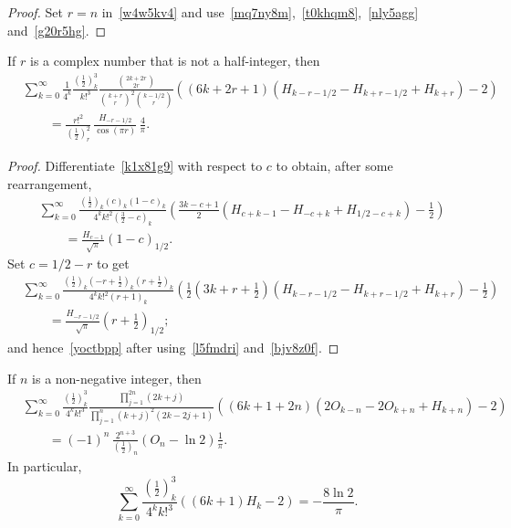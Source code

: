 \documentclass[12pt,reqno]{article}
\begin{document}
\begin{proof}
Set $r=n$ in~\eqref{w4w5kv4} and use~\eqref{mq7ny8m},~\eqref{t0khqm8},~\eqref{nly5agg} and~\eqref{g20r5hg}.
\end{proof}
\begin{theorem}
If $r$ is a complex number that is not a half-integer, then
\begin{align}\label{yoctbpp}
&\sum_{k = 0}^\infty  {\frac{1}{{4^k }}\frac{{\left( {\frac{1}{2}} \right)_k^3 }}{{k!^3 }}\frac{{\binom{{2k + 2r}}{{2r}}}}{{\binom{{k + r}}{r}^2 \binom{{k - 1/2}}{r}}}\left( {\left( {6k + 2r + 1} \right)\left( {H_{k - r - 1/2}  - H_{k + r - 1/2}  + H_{k + r} } \right) - 2} \right)}\nonumber\\ 
&\qquad = \frac{{r!^2 }}{{\left( {\frac{1}{2}} \right)_r^2 }}\,\frac{{H_{ - r - 1/2} }}{{\cos \left( {\pi r} \right)}}\,\frac{4}{\pi }.
\end{align}
\end{theorem}
\begin{proof}
Differentiate~\eqref{k1x81g9} with respect to $c$ to obtain, after some rearrangement,
\begin{align}
&\sum_{k = 0}^\infty  {\frac{{\left( {\frac{1}{2}} \right)_k \left( c \right)_k \left( {1 - c} \right)_k }}{{4^kk!^2 \left( {\frac32 - c} \right)_k }}\left( {\frac{{3k - c + 1}}{2}\left( {H_{c + k - 1}  - H_{ - c + k}  + H_{1/2 - c + k} } \right) - \frac{1}{2}} \right)}\nonumber\\
&\qquad  = \frac{{H_{c - 1} }}{{\sqrt \pi  }}\left( {1 - c} \right)_{1/2} .
\end{align}
Set $c=1/2-r$ to get
\begin{align}\label{pehnhlp}
&\sum_{k = 0}^\infty  {\frac{{\left( {\frac{1}{2}} \right)_k \left( { - r + \frac{1}{2}} \right)_k \left( {r + \frac{1}{2}} \right)_k }}{{4^kk!^2 \left( {r + 1} \right)_k }}\left( {\frac{1}{2}\left( {3k + r + \frac{1}{2}} \right)\left( {H_{k - r - 1/2}  - H_{k + r - 1/2}  + H_{k + r} } \right) - \frac{1}{2}} \right)}\nonumber\\
&\qquad  = \frac{{H_{ - r - 1/2} }}{{\sqrt \pi  }}\left( {r + \frac{1}{2}} \right)_{1/2} ;
\end{align}
and hence~\eqref{yoctbpp} after using~\eqref{l5fmdri} and~\eqref{bjv8z0f}.
\end{proof}
\begin{corollary}
If $n$ is a non-negative integer, then
\begin{align*}
&\sum_{k = 0}^\infty  {\frac{{\left( {\frac{1}{2}} \right)_k^3 }}{{4^k k!^3 }}\frac{{\prod_{j = 1}^{2n} {\left( {2k + j} \right)} }}{{\prod_{j = 1}^n {\left( {k + j} \right)^2 \left( {2k - 2j + 1} \right)} }}\left( {\left( {6k + 1 + 2n} \right)\left( {2O_{k - n}  - 2O_{k + n}  + H_{k + n} } \right) - 2} \right)}\\
&\qquad  =( - 1)^n\,\frac{{2^{n + 3} }}{{\left( {\frac{1}{2}} \right)_n }}\left( {O_n  - \ln 2} \right)\frac{1}{\pi }.
\end{align*}
In particular,
\begin{equation}
\sum_{k = 0}^\infty  {\frac{{\left( {\frac{1}{2}} \right)_k^3 }}{{4^k k!^3 }}\left( {\left( {6k + 1} \right)H_k  - 2} \right)}  =  - \frac{{8\ln 2}}{\pi }.
\end{equation}
\end{corollary}
\end{document}
